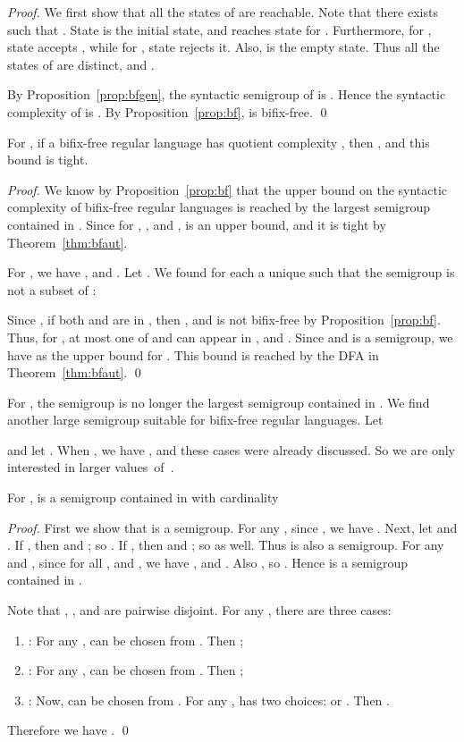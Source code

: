 \documentclass{llncs}
\newcommand{\be}{\begin{enumerate}}
\newcommand{\ee}{\end{enumerate}}
\begin{document}
\begin{proof}\label{proof:bfaut}
We first show that all the states of  are reachable. 
Note that there exists  such that . 
State  is the initial state, and
  reaches  state  for . 
Furthermore, for , state  accepts  , while for ,  state  rejects it. Also,  is the empty state. Thus all the states of  are distinct, and . 

By Proposition~\ref{prop:bfgen}, the syntactic semigroup of  is . Hence the syntactic complexity of  is . By Proposition~\ref{prop:bf},  is bifix-free. \qed
\end{proof}

\begin{theorem}\label{thm:bfsmall} 
For , if a bifix-free regular language  has quotient complexity , then , and this bound is tight. 
\end{theorem}

\begin{proof}
We know by Proposition~\ref{prop:bf} that the upper bound on the syntactic complexity of bifix-free regular languages is reached by the largest semigroup contained in . Since  for , , and ,  is an upper bound, and it is tight by Theorem~\ref{thm:bfaut}. 

For , we have , and . Let . We found for each  a unique  such that the semigroup  is not a subset of :


Since , if both  and  are in ,
then , and   is not bifix-free by Proposition~\ref{prop:bf}. Thus, for , at most one of  and  can appear in , and . Since  and  is a semigroup, we have  as the upper bound for . This bound is reached by the DFA  in Theorem~\ref{thm:bfaut}. \qed 
\end{proof}


For , the semigroup  is no longer the largest semigroup contained in . We find another large semigroup  suitable for bifix-free regular languages. Let 

and let . 
When , we have , and these cases were already discussed. So we are only interested in larger values~of~. 

\begin{proposition}\label{prop:Rcard} 
For ,  is a semigroup contained in  with cardinality 

\end{proposition}

\begin{proof} 

First we show that  is a semigroup. For any , since , we have . Next, let  and . If , then  and ; so . If , then  and ; so  as well. Thus  is also a semigroup. For any  and , since  for all , and , we have , and . Also , so . Hence  is a semigroup contained in . 


Note that , , and  are pairwise disjoint. For any , there are three cases: 

\be
\item : For any ,  can be chosen from . Then ; 
\item : For any ,  can be chosen from . Then ; 
\item : Now,  can be chosen from . For any ,  has two choices:  or . Then . 
\ee 
Therefore we have . \qed
\end{proof}
\end{document}
